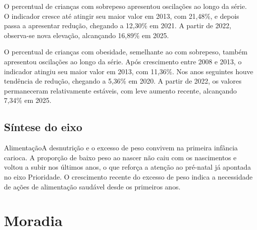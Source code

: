 
O percentual de crianças com sobrepeso apresentou oscilações ao longo da série. O indicador cresce até atingir seu maior valor em 2013, com 21,48\%, e depois passa a apresentar redução, chegando a 12,30\% em 2021. A partir de 2022, observa-se nova elevação, alcançando 16,89\% em 2025.


O percentual de crianças com obesidade, semelhante ao com sobrepeso, também apresentou oscilações ao longo da série. Após crescimento entre 2008 e 2013, o indicador atingiu seu maior valor em 2013, com 11,36\%. Nos anos seguintes houve tendência de redução, chegando a 5,36\% em 2020. A partir de 2022, os valores permaneceram relativamente estáveis, com leve aumento recente, alcançando 7,34\% em 2025.


\section{Síntese do eixo}

\begin{sintese}{Alimentação}A desnutrição e o excesso de peso convivem na primeira infância carioca. A proporção de baixo peso ao nascer não caiu com os nascimentos e voltou a subir nos últimos anos, o que reforça a atenção ao pré-natal já apontada no eixo Prioridade. O crescimento recente do excesso de peso indica a necessidade de ações de alimentação saudável desde os primeiros anos.\end{sintese}


\chapter{Moradia}\label{cap:eixo-7}

